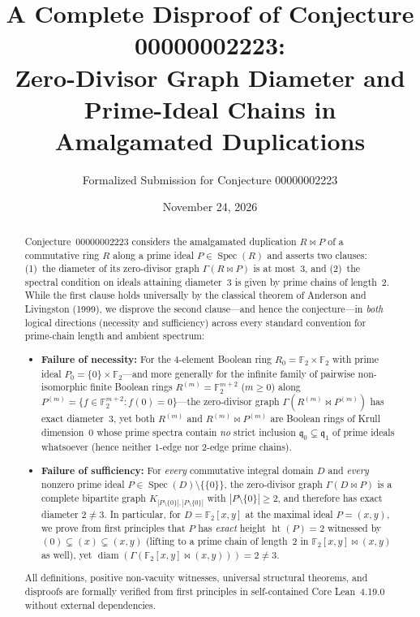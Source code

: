 \documentclass[11pt]{article}
\title{\textbf{A Complete Disproof of Conjecture 00000002223:\\
Zero-Divisor Graph Diameter and Prime-Ideal Chains in Amalgamated Duplications}}
\author{Formalized Submission for Conjecture 00000002223}
\date{November 24, 2026}
\theoremstyle{definition}
\newcommand{\Spec}{\operatorname{Spec}}
\newcommand{\diam}{\operatorname{diam}}
\newcommand{\htop}{\operatorname{ht}}
\newcommand{\FF}{\mathbb{F}}
\begin{document}
\maketitle

\begin{abstract}
Conjecture~00000002223 considers the amalgamated duplication $R \bowtie P$ of a
commutative ring $R$ along a prime ideal $P \in \Spec(R)$ and asserts two clauses:
(1)~the diameter of its zero-divisor graph $\Gamma(R \bowtie P)$ is at most~$3$, and
(2)~the spectral condition on ideals attaining diameter~$3$ is given by prime chains of
length~$2$. While the first clause holds universally by the classical theorem of
Anderson and Livingston (1999), we disprove the second clause---and hence the
conjecture---in \emph{both} logical directions (necessity and sufficiency) across every
standard convention for prime-chain length and ambient spectrum:
\begin{itemize}
  \item \textbf{Failure of necessity:} For the $4$-element Boolean ring
  $R_0 = \FF_2 \times \FF_2$ with prime ideal $P_0 = \{0\} \times \FF_2$---and more
  generally for the infinite family of pairwise non-isomorphic finite Boolean rings
  $R^{(m)} = \FF_2^{m+2}$ ($m \ge 0$) along $P^{(m)} = \{f \in \FF_2^{m+2} : f(0) = 0\}$---the
  zero-divisor graph $\Gamma(R^{(m)} \bowtie P^{(m)})$ has exact diameter~$3$, yet both
  $R^{(m)}$ and $R^{(m)} \bowtie P^{(m)}$ are Boolean rings of Krull dimension~$0$ whose
  prime spectra contain \emph{no} strict inclusion $\mathfrak{q}_0 \subsetneq \mathfrak{q}_1$
  of prime ideals whatsoever (hence neither $1$-edge nor $2$-edge prime chains).
  \item \textbf{Failure of sufficiency:} For \emph{every} commutative integral domain $D$
  and \emph{every} nonzero prime ideal $P \in \Spec(D) \setminus \{\{0\}\}$, the
  zero-divisor graph $\Gamma(D \bowtie P)$ is a complete bipartite graph
  $K_{|P \setminus \{0\}|, |P \setminus \{0\}|}$ with $|P \setminus \{0\}| \ge 2$, and
  therefore has exact diameter $2 \neq 3$. In particular, for $D = \FF_2[x, y]$ at the
  maximal ideal $P = (x, y)$, we prove from first principles that $P$ has \emph{exact}
  height $\htop(P) = 2$ witnessed by $(0) \subsetneq (x) \subsetneq (x, y)$ (lifting to a
  prime chain of length~$2$ in $\FF_2[x, y] \bowtie (x, y)$ as well), yet
  $\diam(\Gamma(\FF_2[x, y] \bowtie (x, y))) = 2 \neq 3$.
\end{itemize}
All definitions, positive non-vacuity witnesses, universal structural theorems, and
disproofs are formally verified from first principles in self-contained Core Lean~4.19.0
without external dependencies.
\end{abstract}
\end{document}
